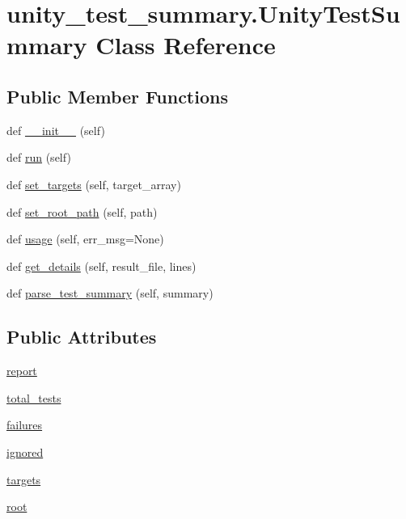 \hypertarget{classunity__test__summary_1_1_unity_test_summary}{}\section{unity\+\_\+test\+\_\+summary.\+Unity\+Test\+Summary Class Reference}
\label{classunity__test__summary_1_1_unity_test_summary}
\subsection*{Public Member Functions}
\begin{DoxyCompactItemize}
\item 
def \hyperlink{classunity__test__summary_1_1_unity_test_summary_a7d10482c28be1ca8844eafb7bb2d0516}{\+\_\+\+\_\+init\+\_\+\+\_\+} (self)
\item 
def \hyperlink{classunity__test__summary_1_1_unity_test_summary_a191111866f7267d605db2f8793ef9a1a}{run} (self)
\item 
def \hyperlink{classunity__test__summary_1_1_unity_test_summary_a5a8af2531586e22b4315e5d09d283cb7}{set\+\_\+targets} (self, target\+\_\+array)
\item 
def \hyperlink{classunity__test__summary_1_1_unity_test_summary_ae03b008285e29a16d2069120878a2c96}{set\+\_\+root\+\_\+path} (self, path)
\item 
def \hyperlink{classunity__test__summary_1_1_unity_test_summary_a066f34e5b57d43f0d2397b0e84f5d92b}{usage} (self, err\+\_\+msg=None)
\item 
def \hyperlink{classunity__test__summary_1_1_unity_test_summary_a9baaa8a7f8b862b125f8991c359b2252}{get\+\_\+details} (self, result\+\_\+file, lines)
\item 
def \hyperlink{classunity__test__summary_1_1_unity_test_summary_ae79303d5a81b382b06c557d6c5bf72e8}{parse\+\_\+test\+\_\+summary} (self, summary)
\end{DoxyCompactItemize}
\subsection*{Public Attributes}
\begin{DoxyCompactItemize}
\item 
\hyperlink{classunity__test__summary_1_1_unity_test_summary_a3e9af40b0081ce3e86ddc63e1fbfa043}{report}
\item 
\hyperlink{classunity__test__summary_1_1_unity_test_summary_abd63a450624526e498bdc1499078f124}{total\+\_\+tests}
\item 
\hyperlink{classunity__test__summary_1_1_unity_test_summary_a67dd44048def2d9bde0385dad9495666}{failures}
\item 
\hyperlink{classunity__test__summary_1_1_unity_test_summary_a65e84f84c4ebb04f5da3affb20366fe9}{ignored}
\item 
\hyperlink{classunity__test__summary_1_1_unity_test_summary_aad532f6e4d7b4af23abd0410aecbfb51}{targets}
\item 
\hyperlink{classunity__test__summary_1_1_unity_test_summary_a8cda0aae4f52ce974faace17a99eff79}{root}
\end{DoxyCompactItemize}


